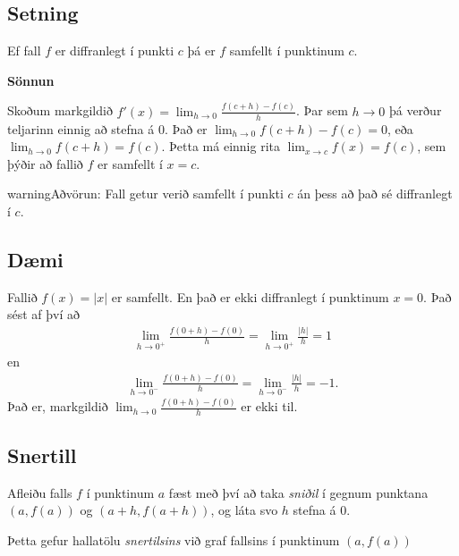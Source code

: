 \documentclass[a4paper,10pt,icelandic]{sphinxmanual}
\begin{document}
\subsection{Setning}
\label{kafli03:setning}
Ef fall \(f\) er diffranlegt í punkti \(c\) þá er \(f\)
samfellt í punktinum \(c\).

\textbf{Sönnun}

Skoðum markgildið \(f'(x)=\lim_{h\to 0} \frac{f(c+h)-f(c)}{h}\). Þar
sem \(h\to 0\) þá verður teljarinn einnig að stefna á 0. Það er
\(\lim_{h \to 0} f(c+h)-f(c) = 0\), eða
\(\lim_{h \to 0} f(c+h) = f(c)\). Þetta má einnig rita
\(\lim_{x \to c} f(x) = f(c)\), sem þýðir að fallið \(f\) er
samfellt í \(x=c\).

\begin{notice}{warning}{Aðvörun:}
Fall getur verið samfellt í punkti \(c\) án þess að það sé
diffranlegt í \(c\).
\end{notice}


\subsection{Dæmi}
\label{kafli03:id1}
Fallið \(f(x) = |x|\) er samfellt. En það er ekki diffranlegt í
punktinum \(x=0\). Það sést af því að
\begin{equation*}
\begin{split}\lim_{h\to 0^+} \frac{f(0+h)-f(0)}{h} = \lim_{h\to 0^+} \frac{|h|}{h} = 1\end{split}
\end{equation*}
en
\begin{equation*}
\begin{split}\lim_{h\to 0^-} \frac{f(0+h)-f(0)}{h} = \lim_{h\to 0^-} \frac{|h|}{h} = -1.\end{split}
\end{equation*}
Það er, markgildið \(\lim_{h\to 0} \frac{f(0+h)-f(0)}{h}\) er ekki til.


\subsection{Snertill}
\label{kafli03:snertill}\label{kafli03:index-1}
Afleiðu falls \(f\) í punktinum \(a\) fæst með því að taka
\textit{sniðil} í gegnum punktana \((a,f(a))\) og \((a+h,f(a+h))\), og
láta svo \(h\) stefna á \(0\).

Þetta gefur hallatölu \textit{snertilsins} við graf fallsins í punktinum
\((a,f(a))\)
\end{document}
